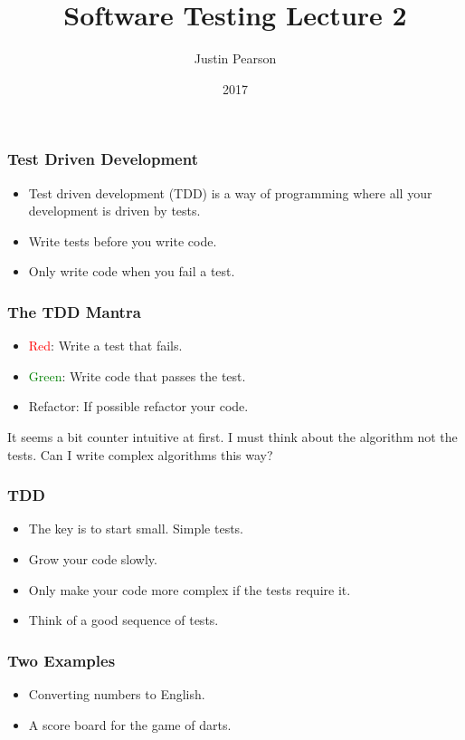 \documentclass{beamer}
\title{Software Testing Lecture 2}
\author{Justin Pearson}
\date{2017}
\begin{document}
\begin{frame}
  \maketitle
\end{frame}
\begin{frame}
\frametitle{Test Driven Development}
\begin{itemize}
\item Test driven development (TDD) is a way of programming where all
  your development is driven by tests.
\item Write tests before you write code. 
\item Only write code when you fail a test. 
\end{itemize}
  \end{frame}
\begin{frame}
\frametitle{The TDD Mantra}
\begin{itemize}
\item \textcolor{red}{Red}: Write a test that fails.
\item \textcolor{green}{Green}: Write code that passes the test.
\item Refactor: If possible refactor your code.
\end{itemize}
It seems a bit counter intuitive at first. I must think about the
algorithm not the tests. Can I write complex algorithms this way?  
\end{frame}
\begin{frame}
  \frametitle{TDD}
  \begin{itemize}
  \item The key is to start small. Simple tests.
  \item Grow your code slowly. 
  \item Only make your code more complex if the tests require it.
  \item Think of a good sequence of tests.
  \end{itemize}
\end{frame}
\begin{frame}
  \frametitle{Two Examples}
  \begin{itemize}
  \item Converting numbers to English.
  \item A score board for the game of darts.
  \end{itemize}
\end{frame}
\end{document}
